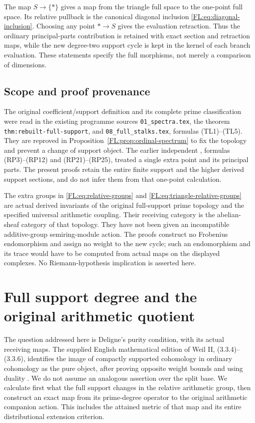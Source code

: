 \documentclass[11pt,a4paper]{article}
\theoremstyle{definition}\newtheorem{definition}[theorem]{Definition}
\begin{document}
The map $S\to\{*\}$ gives a map from the triangle full space to the
one-point full space. Its relative pullback is the canonical diagonal
inclusion \eqref{FL:eq:diagonal-inclusion}. Choosing any point
$*\to S$ gives the evaluation retraction. Thus the ordinary
principal-parts contribution is retained with exact section and
retraction maps, while the new degree-two support cycle is kept in
the kernel of each branch evaluation. These statements specify the
full morphisms, not merely a comparison of dimensions.

\subsection{Scope and proof provenance}

The original coefficient/support definition and its complete prime
classification were read in the existing programme sources
\texttt{01\_spectra.tex}, the theorem
\texttt{thm:rebuilt-full-support}, and
\texttt{08\_full\_stalks.tex}, formulas (TL1)--(TL5). They are
reproved in Proposition~\ref{FL:prop:ordinal-spectrum} to fix the topology
and prevent a change of support object. The earlier independent
, formulas (RP3)--(RP12)
and (RP21)--(RP25), treated a single extra point and its principal
parts. The present proofs retain the entire finite support and the
higher derived support sections, and do not infer them from that
one-point calculation.

The extra groups in \eqref{FL:eq:relative-groups} and
\eqref{FL:eq:triangle-relative-groups} are actual derived invariants of
the original full-support prime topology and the specified universal
arithmetic coupling. Their receiving category is the abelian-sheaf
category of that topology. They have not been given an incompatible
additive-group semiring-module action. The proofs construct no
Frobenius endomorphism and assign no weight to the new cycle; such
an endomorphism and its trace would have to be computed from actual
maps on the displayed complexes. No Riemann-hypothesis implication
is asserted here.


\section{Full support degree and the original arithmetic quotient}
\label{sec:full-support-degree}
The question addressed here is Deligne's purity condition, with its
actual receiving maps. The supplied English mathematical edition of
Weil II, (3.3.4)--(3.3.6), identifies the image of compactly supported
cohomology in ordinary cohomology as the pure object, after proving
opposite weight bounds and using duality \cite{DeligneII}. We do not
assume an analogous assertion over the split base. We calculate first
what the full support changes in the relative arithmetic group, then
construct an exact map from its prime-degree operator to the original
arithmetic companion action. This includes the attained metric of that
map and its entire distributional extension criterion.
\end{document}

